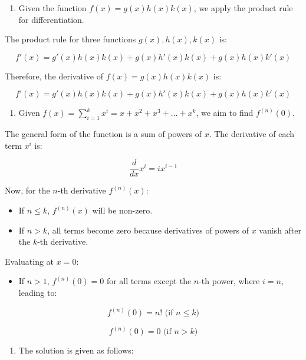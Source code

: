 \documentclass[
]{book}
\providecommand{\tightlist}{%
  \setlength{\itemsep}{0pt}\setlength{\parskip}{0pt}}
\theoremstyle{definition}
\theoremstyle{definition}
\theoremstyle{definition}
\theoremstyle{definition}
\theoremstyle{remark}
\begin{document}
\begin{enumerate}
\def\labelenumi{\arabic{enumi}.}
\tightlist
\item
  Given the function \(f(x) = g(x)h(x)k(x)\), we apply the product rule for differentiation.
\end{enumerate}

The product rule for three functions \(g(x), h(x), k(x)\) is:

\[
f'(x) = g'(x)h(x)k(x) + g(x)h'(x)k(x) + g(x)h(x)k'(x)
\]

Therefore, the derivative of \(f(x) = g(x)h(x)k(x)\) is:

\[
f'(x) = g'(x)h(x)k(x) + g(x)h'(x)k(x) + g(x)h(x)k'(x)
\]

\begin{enumerate}
\def\labelenumi{\arabic{enumi}.}
\setcounter{enumi}{1}
\tightlist
\item
  Given \(f(x) = \sum_{i=1}^k x^i = x + x^2 + x^3 + \dots + x^k\), we aim to find \(f^{(n)}(0)\).
\end{enumerate}

The general form of the function is a sum of powers of \(x\). The derivative of each term \(x^i\) is:

\[
\frac{d}{dx}x^i = ix^{i-1}
\]

Now, for the \(n\)-th derivative \(f^{(n)}(x)\):

\begin{itemize}
\tightlist
\item
  If \(n \leq k\), \(f^{(n)}(x)\) will be non-zero.
\item
  If \(n > k\), all terms become zero because derivatives of powers of \(x\) vanish after the \(k\)-th derivative.
\end{itemize}

Evaluating at \(x = 0\):

\begin{itemize}
\tightlist
\item
  If \(n > 1\), \(f^{(n)}(0) = 0\) for all terms except the \(n\)-th power, where \(i = n\), leading to:
\end{itemize}

\[
f^{(n)}(0) = n! \text{ (if } n \leq k \text{)}
\]

\[
f^{(n)}(0) = 0 \text{ (if } n > k \text{)}
\]

\begin{enumerate}
\def\labelenumi{\arabic{enumi}.}
\setcounter{enumi}{2}
\tightlist
\item
  The solution is given as follows:
\end{enumerate}
\end{document}
